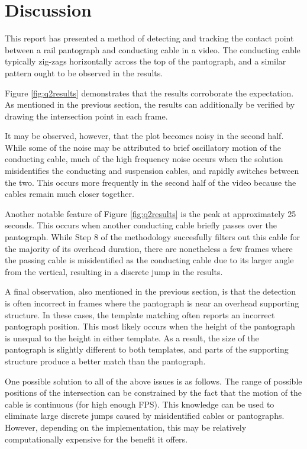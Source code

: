 \newpage
\section{Discussion}

This report has presented a method of detecting and tracking the contact point between a rail pantograph and conducting cable in a video. The conducting cable typically zig-zags horizontally across the top of the pantograph, and a similar pattern ought to be observed in the results.

Figure \ref{fig:q2results} demonstrates that the results corroborate the expectation. As mentioned in the previous section, the results can additionally be verified by drawing the intersection point in each frame.

It may be observed, however, that the plot becomes noisy in the second half. While some of the noise may be attributed to brief oscillatory motion of the conducting cable, much of the high frequency noise occurs when the solution misidentifies the conducting and suspension cables, and rapidly switches between the two. This occurs more frequently in the second half of the video because the cables remain much closer together.

Another notable feature of Figure \ref{fig:q2results} is the peak at approximately 25 seconds. This occurs when another conducting cable briefly passes over the pantograph. While Step 8 of the methodology succesfully filters out this cable for the majority of its overhead duration, there are nonetheless a few frames where the passing cable is misidentified as the conducting cable due to its larger angle from the vertical, resulting in a discrete jump in the results.

A final observation, also mentioned in the previous section, is that the detection is often incorrect in frames where the pantograph is near an overhead supporting structure. In these cases, the template matching often reports an incorrect pantograph position. This most likely occurs when the height of the pantograph is unequal to the height in either template. As a result, the size of the pantograph is slightly different to both templates, and parts of the supporting structure produce a better match than the pantograph.

One possible solution to all of the above issues is as follows. The range of possible positions of the intersection can be constrained by the fact that the motion of the cable is continuous (for high enough FPS). This knowledge can be used to eliminate large discrete jumps caused by misidentified cables or pantographs. However, depending on the implementation, this may be relatively computationally expensive for the benefit it offers.

